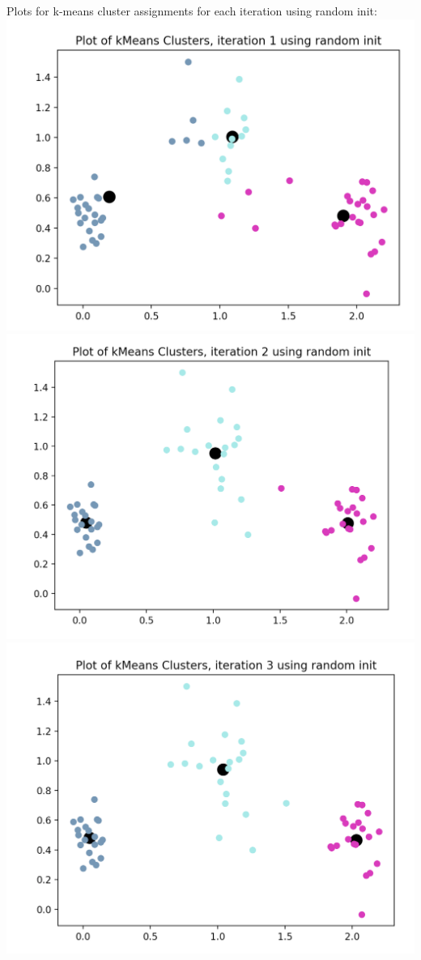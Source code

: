 \documentclass[11pt]{article}
\newcommand{\solution}[1]{{{\color{blue}{\bf Solution:} {#1}}}}
\begin{document}
\solution{
Plots for k-means cluster assignments for each iteration using random init: \newline{}
\includegraphics[scale = 0.5]{kmeans-rand-iter-1.png} \newline{}
\includegraphics[scale = 0.5]{kmeans-rand-iter-2.png} \newline{}
\includegraphics[scale = 0.5]{kmeans-rand-iter-3.png} \newline{}
}
\end{document}
